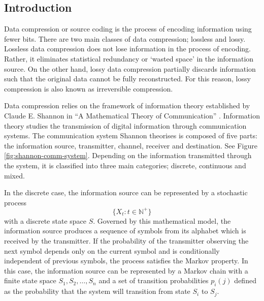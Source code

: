 \subsection{Introduction}

Data compression or source coding is the process of encoding information using fewer bits. There are two main classes of data compression; lossless and lossy. Lossless data compression does not lose information in the process of encoding. Rather, it eliminates statistical redundancy or `wasted space' in the information source. On the other hand, lossy data compression partially discards information such that the original data cannot be fully reconstructed. For this reason, lossy compression is also known as irreversible compression.


%


Data compression relies on the framework of information theory established by Claude E. Shannon in ``A Mathematical Theory of Communication'' \cite{shannon}. Information theory studies the transmission of digital information through communication systems. The communication system Shannon theorises is composed of five parts: the information source, transmitter, channel, receiver and destination. See Figure \ref{fig:shannon-comm-system}. Depending on the information transmitted through the system, it is classified into three main categories; discrete, continuous and mixed.



In the discrete case, the information source can be represented by a stochastic process \[\{X_t: t\in\mathbb{N}^+\}\] with a discrete state space $S$. Governed by this mathematical model, the information source produces a sequence of symbols from its alphabet which is received by the transmitter. If the probability of the transmitter observing the next symbol depends only on the current symbol and is conditionally independent of previous symbols, the process satisfies the Markov property. In this case, the information source can be represented by a Markov chain with a finite state space $S_1,S_2,\dots,S_n$ and a set of transition probabilities $p_i(j)$ defined as the probability that the system will transition from state $S_i$ to $S_j$.

